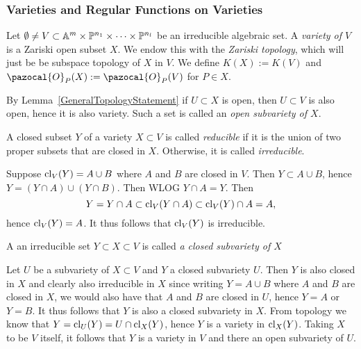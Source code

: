     \subsubsection{Varieties and Regular Functions on Varieties}
    \begin{definition}
        Let $\emptyset \neq V \subset \mathbb{A}^m\times \mathbb{P}^{n_1}\times \cdots \times \mathbb{P}^{n_l}$ be an irreducible algebraic set. A \textit{variety of $V$} is a Zariski open subset $X$. We endow this with the \textit{Zariski topology}, which will just be be subspace topology of $X$ in $V$. We define $K(X):= K(V)$ and $\pazocal{O}_P(X):=\pazocal{O}_P(V)$ for $P\in X$.
    \end{definition}
    \begin{remark}
        By Lemma~\ref{GeneralTopologyStatement} if $U\subset X$ is open, then $U\subset V$ is also open, hence it is also variety. Such a set is called an \textit{open subvariety of $X$}.
    \end{remark}
    \begin{definition}
        A closed subset $Y$ of a variety $X\subset V$ is called \emph{reducible} if it is the union of two proper subsets that are closed in $X$. Otherwise, it is called \emph{irreducible}. 
    \end{definition}
    \begin{remark}
        Suppose $\mathrm{cl}_V(Y)= A\cup B$ where $A$ and $B$ are closed in $V$. Then $Y\subset A\cup B$, hence $Y=(Y\cap A) \cup (Y\cap B)$. Then WLOG $Y\cap A = Y$. Then 
        $$Y=Y\cap A\subset \mathrm{cl}_V(Y\cap A)\subset \mathrm{cl}_V(Y)\cap A=A,$$ hence $\mathrm{cl}_V(Y)=A$. It thus follows that $\mathrm{cl}_V(Y)$ is irreducible.  
    \end{remark}
    \begin{definition}
        A an irreducible set $Y\subset X\subset V$ is called \textit{a closed subvariety of $X$}
    \end{definition}
    \begin{remark}
        Let $U$ be a subvariety of $X\subset V$ and $Y$ a closed subvariety $U$. Then $Y$ is also closed in $X$ and clearly also irreducible in $X$ since writing $Y=A\cup B$ where $A$ and $B$ are closed in $X$, we would also have that $A$ and $B$ are closed in $U$, hence $Y=A$ or $Y=B$. It thus follows that $Y$ is also a closed subvariety in $X$. From topology we know that $Y=\mathrm{cl}_U(Y)=U\cap \mathrm{cl}_X(Y)$, hence $Y$ is a variety in $\mathrm{cl}_X(Y)$. Taking $X$ to be $V$ itself, it follows that $Y$ is a variety in $V$ and there an open subvariety of $U$. 
    \end{remark}
